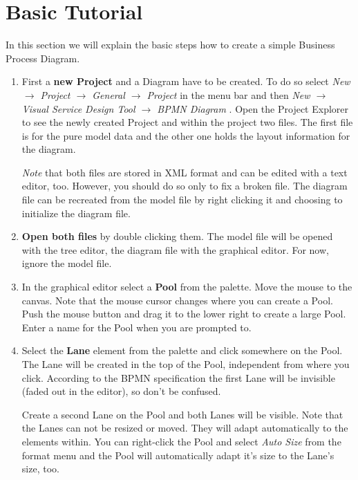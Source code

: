 \section{Basic Tutorial}


In this section we will explain the basic steps how to create a simple Business Process Diagram.

\begin{enumerate}

\item First a \textbf{new Project} and a Diagram have to be created. To do so select \emph{ New $\rightarrow$ Project $\rightarrow$ General $\rightarrow$ Project } in the menu bar and then \emph{ New $\rightarrow$ Visual Service Design Tool $\rightarrow$ BPMN Diagram }. Open the Project Explorer to see the newly created Project and within the project two files. The first file is for the pure model data and the other one holds the layout information for the diagram.

\emph{Note} that both files are stored in XML format and can be edited with a text editor, too. However, you should do so only to fix a broken file. The diagram file can be recreated from the model file by right clicking it and choosing to initialize the diagram file.

\item \textbf{Open both files} by double clicking them. The model file will be opened with the tree editor, the diagram file with the graphical editor. For now, ignore the model file.

\item In the graphical editor select a \textbf{Pool} from the palette. Move the mouse to the canvas. Note that the mouse cursor changes where you can create a Pool. Push the mouse button and drag it to the lower right to create a large Pool. Enter a name for the Pool when you are prompted to.

\item Select the \textbf{Lane} element from the palette and click somewhere on the Pool. The Lane will be created in the top of the Pool, independent from where you click. According to the BPMN specification the first Lane will be invisible (faded out in the editor), so don't be confused.

Create a second Lane on the Pool and both Lanes will be visible. Note that the Lanes can not be resized or moved. They will adapt automatically to the elements within. You can right-click the Pool and select \emph{Auto Size} from the format menu and the Pool will automatically adapt it's size to the Lane's size, too.


\end{enumerate}
